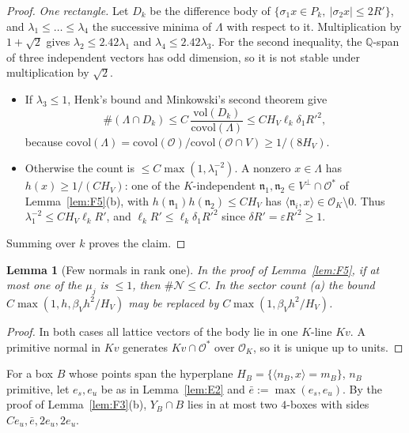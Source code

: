 \documentclass[aps,prx,twocolumn,superscriptaddress,nofootinbib,longbibliography]{revtex4-2}
\theoremstyle{plain}
\newtheorem{lemma}{Lemma}
\theoremstyle{definition}
\theoremstyle{remark}
\newcommand{\Q}{\mathbb{Q}}
\begin{document}
\begin{proof}
\emph{One rectangle.} Let $D_k$ be the difference body of $\{\sigma_1x\in P_k,\ |\sigma_2x|\le2R'\}$, and
$\lambda_1\le\dots\le\lambda_4$ the successive minima of $\Lambda$ with respect to it. Multiplication by
$1+\sqrt2$ gives $\lambda_2\le2.42\lambda_1$ and $\lambda_4\le2.42\lambda_3$. For the second inequality, the $\Q$-span of three
independent vectors has odd dimension, so it is not stable under multiplication by $\sqrt2$.
\begin{itemize}\setlength\itemsep{0pt}
\item If $\lambda_3\le1$, Henk's bound and Minkowski's second theorem give
\[\#(\Lambda\cap D_k)\le C\,\frac{\mathrm{vol}(D_k)}{\mathrm{covol}(\Lambda)}\le CH_V\ell_k\delta_1R'^2,\]
because
$\mathrm{covol}(\Lambda)=\mathrm{covol}(\mathcal O)/\mathrm{covol}(\mathcal O\cap V)\ge1/(8H_V)$.
\item Otherwise the count is $\le C\max(1,\lambda_1^{-2})$. A nonzero $x\in\Lambda$ has $h(x)\ge1/(CH_V)$:
one of the $K$-independent $\mathfrak n_1,\mathfrak n_2\in V^\perp\cap\mathcal O^*$ of Lemma~\ref{lem:F5}(b), with $h(\mathfrak n_1)h(\mathfrak n_2)\le CH_V$
has $\langle\mathfrak n_i,x\rangle\in\mathcal O_K\setminus0$. Thus $\lambda_1^{-2}\le CH_V\ell_kR'$, and
$\ell_kR'\le\ell_k\delta_1R'^2$ since $\delta R'=\varepsilon R'^2\ge1$.
\end{itemize}
Summing over $k$ proves the claim.
\end{proof}

\begin{lemma}[Few normals in rank one]\label{lem:G2}
In the proof of Lemma~\ref{lem:F5}, if at most one of the $\mu_j$ is $\le1$, then $\#\mathcal N\le C$. In the
sector count (a) the bound $C\max(1,h,\beta_Vh^2/H_V)$ may be replaced by $C\max(1,\beta_Vh^2/H_V)$.
\end{lemma}
\begin{proof}
In both cases all lattice vectors of the body lie in one $K$-line $Kv$. A primitive normal in $Kv$
generates $Kv\cap\mathcal O^*$ over $\mathcal O_K$, so it is unique up to units.
\end{proof}

For a box $B$ whose points span the hyperplane $H_B=\{\langle n_B,x\rangle=m_B\}$, $n_B$ primitive, let
$e_s,e_u$ be as in Lemma~\ref{lem:E2} and $\bar e:=\max(e_s,e_u)$. By the proof of
Lemma~\ref{lem:F3}(b), $Y_B\cap B$ lies in at most two $4$-boxes with sides $Ce_u,\bar e,2e_u,2e_u$.
\end{document}
